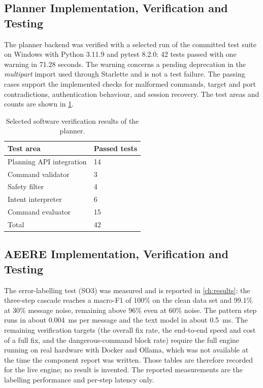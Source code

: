 \subsection{Planner Implementation, Verification and Testing}\label{sec:testing-planner}

The planner backend was verified with a selected run of the committed test suite
on Windows with Python 3.11.9 and pytest 8.2.0: 42 tests passed with one warning
in 71.28 seconds. The warning concerns a pending deprecation in the \emph{multipart}
import used through Starlette and is not a test failure. The passing cases
support the implemented checks for malformed commands, target and port
contradictions, authentication behaviour, and session recovery. The test areas
and counts are shown in \cref{tab:planner-tests}.

\begin{table}[htbp]
  \centering
  \begin{tabular}{@{}p{}p{}@{}}
    \toprule
    \textbf{Test area} & \textbf{Passed tests}\\
    \midrule
    Planning API integration & 14\\
    Command validator & 3\\
    Safety filter & 4\\
    Intent interpreter & 6\\
    Command evaluator & 15\\
    \midrule
    Total & 42\\
    \bottomrule
  \end{tabular}
  \caption{Selected software verification results of the planner.}\label{tab:planner-tests}
\end{table}

\subsection{AEERE Implementation, Verification and Testing}\label{sec:testing-aeere}

The error-labelling test (SO3) was measured and is reported in
\cref{ch:results}: the three-step cascade reaches a macro-F1 of 100\% on the
clean data set and 99.1\% at 30\% message noise, remaining above 96\% even at
60\% noise. The pattern step runs in about 0.004~ms per message and the text
model in about 0.5~ms. The remaining verification targets (the overall fix rate,
the end-to-end speed and cost of a full fix, and the dangerous-command block
rate) require the full engine running on real hardware with Docker and Ollama,
which was not available at the time the component report was written. Those
tables are therefore recorded for the live engine; no result is invented. The
reported measurements are the labelling performance and per-step latency only.

